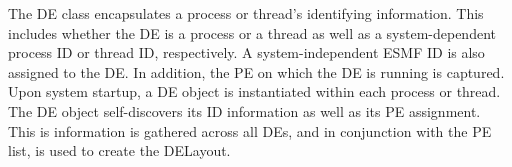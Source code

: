 
The DE class encapsulates a process or thread's identifying information.  This
includes whether the DE is a process or a thread as well as a system-dependent
process ID or thread ID, respectively.  A system-independent ESMF ID is also
assigned to the DE.  In addition, the PE on which the DE is running is
captured.  Upon system startup, a DE object is instantiated within each process
or thread.  The DE object self-discovers its ID information as well as its PE
assignment.  This is information is gathered across all DEs, and in
conjunction with the PE list, is used to create the DELayout.
